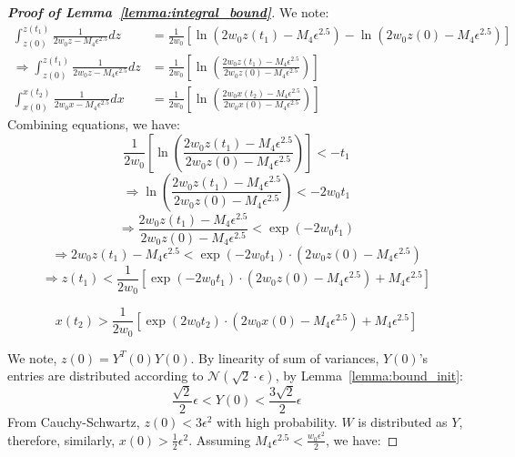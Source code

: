 \begin{proof}[\textbf{Proof of Lemma~\ref{lemma:integral_bound}}]
We note:
\begin{align}
   \int_{z(0)}^{z(t_1)} \frac{1}{2w_0 z -M_4 \epsilon^{2.5}} dz &= \frac{1}{2w_0} [\ln(2w_0 z(t_1)  -M_4 \epsilon^{2.5}) -\ln(2w_0 z(0) -M_4 \epsilon^{2.5} )] \\
   \Rightarrow\int_{z(0)}^{z(t_1)} \frac{1}{2w_0 z -M_4 \epsilon^{2.5}} dz &= \frac{1}{2w_0} \left[ \ln \left( \frac{2w_0 z(t_1) -M_4 \epsilon^{2.5} }{2w_0 z(0) -M_4 \epsilon^{2.5} }\right) \right] \\
   \int_{x(0)}^{x(t_2)} \frac{1}{2w_0 x -M_4 \epsilon^{2.5}} dx &= \frac{1}{2w_0} \left[ \ln \left( \frac{2w_0 x(t_2) -M_4 \epsilon^{2.5} }{2w_0 x(0) -M_4 \epsilon^{2.5} }\right) \right] 
\end{align}
Combining equations, we have:
\begin{equation}
   \frac{1}{2w_0} \left[ \ln \left( \frac{2w_0 z(t_1) -M_4 \epsilon^{2.5} }{2w_0 z(0) -M_4 \epsilon^{2.5} } \right) \right]  < -t_1
\end{equation}
\begin{equation}
   \Rightarrow \ln \left( \frac{2w_0 z(t_1) -M_4 \epsilon^{2.5} }{2w_0 z(0) -M_4 \epsilon^{2.5} } \right) < -2w_0t_1
\end{equation}
\begin{equation}
   \Rightarrow \frac{2w_0 z(t_1) -M_4 \epsilon^{2.5} }{2w_0 z(0) -M_4 \epsilon^{2.5} } < \exp(-2w_0t_1)
\end{equation}
\begin{equation}
   \Rightarrow 2w_0 z(t_1) -M_4 \epsilon^{2.5} < \exp(-2w_0t_1) \cdot \left(2w_0 z(0) -M_4 \epsilon^{2.5} \right)
\end{equation}
\begin{equation}
   \Rightarrow z(t_1)  < \frac{1}{2w_0}\left[\exp(-2w_0t_1) \cdot (2w_0 z(0) -M_4 \epsilon^{2.5}) + M_4 \epsilon^{2.5} \right]
\end{equation}

\begin{equation}
    x(t_2)  > \frac{1}{2w_0}\left[\exp(2w_0t_2) \cdot (2w_0 x(0) -M_4 \epsilon^{2.5}) + M_4 \epsilon^{2.5} \right]
\end{equation}

We note, $z(0) = Y^T(0)Y(0)$. 
By linearity of sum of variances, $Y(0)$'s entries are distributed according to $\mathcal{N}(\sqrt{2}\cdot \epsilon)$,  by Lemma~\ref{lemma:bound_init}:
\begin{equation}
    \frac{\sqrt{2}}{2}\epsilon<Y(0)<\frac{3\sqrt{2}}{2}\epsilon
\end{equation}
From Cauchy-Schwartz, $z(0)<3\epsilon^2$ with high probability.
$W$ is distributed as $Y$, therefore, similarly, $x(0)> \frac{1}{2}\epsilon^2$.
Assuming $M_4 \epsilon^{2.5} < \frac{w_0 \epsilon^2}{2}$, we have:


\end{proof}
